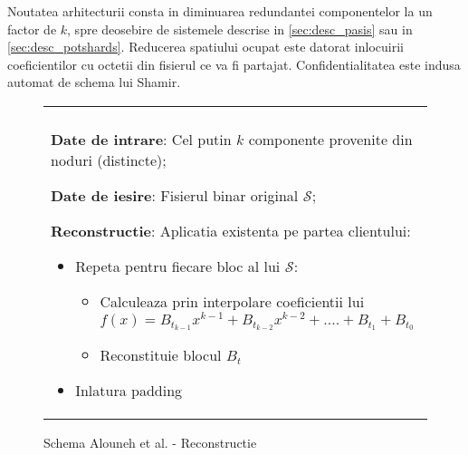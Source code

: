 \documentclass{llncs}
\begin{document}
Noutatea arhitecturii consta in diminuarea redundantei componentelor la un factor de $k$, spre deosebire de sistemele descrise in \ref{sec:desc_pasis} sau in \ref{sec:desc_potshards}. Reducerea spatiului ocupat este datorat inlocuirii coeficientilor cu octetii din fisierul ce va fi partajat. Confidentialitatea este indusa automat de schema lui Shamir.

\begin{figure*}[h!]

\begin{tabular}{|p{\textwidth}|}
\hline

\\
\hspace{.1in}
\textbf{Date de intrare}: Cel putin $k$ componente provenite din noduri (distincte);
\medskip

\hspace{.1in}
\textbf{Date de iesire}: Fisierul binar original $\mathcal{S}$;
\medskip

\hspace{.1in}
\textbf{Reconstructie}: Aplicatia existenta pe partea clientului: 
	\begin{itemize}
		\item Repeta pentru fiecare bloc al lui $\mathcal{S}$:
		\begin{itemize}
			\item Calculeaza prin interpolare coeficientii lui $f(x)=B_{t_{k - 1}}x ^ {k-1} + B_{t_{k - 2}}x ^ {k - 2} + .... + B_{t_1} + B_{t_0}$
			\item Reconstituie blocul $B_t$
		\end{itemize}
		\item Inlatura padding%
	\end{itemize}

\\
\hline
\end{tabular}
\caption{Schema Alouneh et al. - Reconstructie \cite{AAMK:2013}}
\label{fig:alouneh_reconstruction}
\end{figure*}

\end{document}
